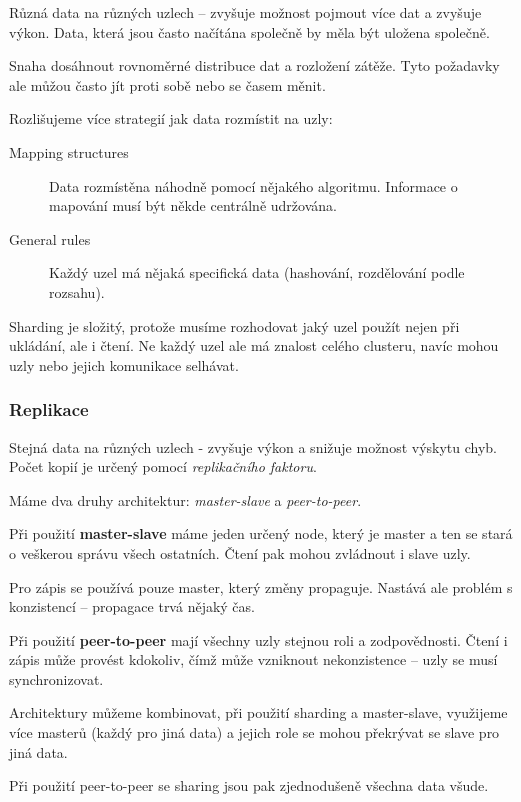Různá data na různých uzlech -- zvyšuje možnost pojmout více dat a zvyšuje výkon.
Data, která jsou často načítána společně by měla být uložena společně.

Snaha dosáhnout rovnoměrné distribuce dat a rozložení zátěže.
Tyto požadavky ale můžou často jít proti sobě nebo se časem měnit.

Rozlišujeme více strategií jak data rozmístit na uzly:

\begin{description}
    \item[Mapping structures] Data rozmístěna náhodně pomocí nějakého algoritmu.
    Informace o mapování musí být někde centrálně udržována.
    \item[General rules] Každý uzel má nějaká specifická data (hashování, rozdělování podle rozsahu).
\end{description}

Sharding je složitý, protože musíme rozhodovat jaký uzel použít nejen při ukládání, ale i čtení.
Ne každý uzel ale má znalost celého clusteru, navíc mohou uzly nebo jejich komunikace selhávat.

\subsubsection*{Replikace}

Stejná data na různých uzlech - zvyšuje výkon a snižuje možnost výskytu chyb.
Počet kopií je určený pomocí \textit{replikačního faktoru}.

Máme dva druhy architektur: \textit{master-slave} a \textit{peer-to-peer}.

Při použití \textbf{master-slave} máme jeden určený node, který je master a ten se stará o veškerou správu všech ostatních.
Čtení pak mohou zvládnout i slave uzly.

Pro zápis se používá pouze master, který změny propaguje.
Nastává ale problém s konzistencí -- propagace trvá nějaký čas.

Při použití \textbf{peer-to-peer} mají všechny uzly stejnou roli a zodpovědnosti.
Čtení i zápis může provést kdokoliv, čímž může vzniknout nekonzistence -- uzly se musí synchronizovat.

Architektury můžeme kombinovat, při použití sharding a master-slave, využijeme více masterů (každý pro jiná data) a jejich role se mohou překrývat se slave pro jiná data.

Při použití peer-to-peer se sharing jsou pak zjednodušeně všechna data všude.


